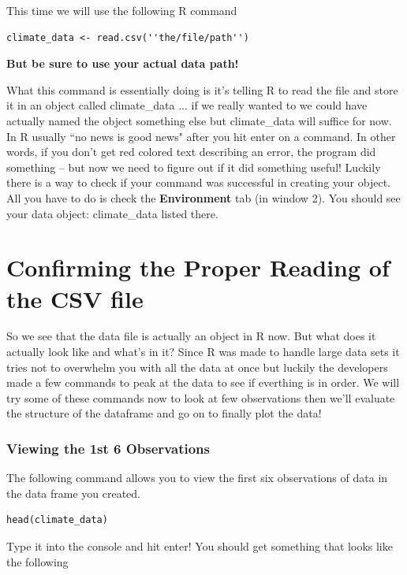 \documentclass{article}\usepackage[]{graphicx}\usepackage[]{color}
\begin{document}
This time we will use the following R command\\
\begin{verbatim}
climate_data <- read.csv(''the/file/path'')
\end{verbatim}

\textbf{But be sure to use your actual data path!}

What this command is essentially doing is it's telling R to read the file and store it in an object called climate\_data ... if we really wanted to we could have actually named the object something else but climate\_data will suffice for now. \\ 

In R usually ``no news is good news" after you hit enter on a command. In other words, if you don't get red colored text describing an error, the program did something -- but now we need to figure out if it did something useful! Luckily there is a way to check if your command was successful in creating your object. All you have to do is check the \textbf{Environment} tab (in window 2). You should see your data object: climate\_data listed there. 



\section{Confirming the Proper Reading of the CSV file}


So we see that the data file is actually an object in R now. But what does it actually look like and what's in it? 
Since R was made to handle large data sets it tries not to overwhelm you with all the data at once but luckily the developers made a few commands to peak at the data to see if everthing is in order. We will try some of these commands now to look at few observations then we'll evaluate the structure of the dataframe and go on to finally plot the data!

\subsubsection{Viewing the 1st 6 Observations}
The following command allows you to view the first six observations of data in the data frame you created.
\begin{verbatim}
head(climate_data)
\end{verbatim}
Type it into the console and hit enter! You should get something that looks like the following
\end{document}

